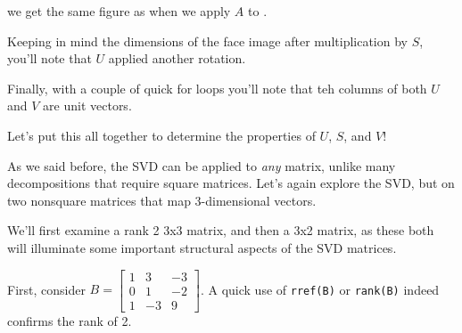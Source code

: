 \documentclass{ximera}
\begin{document}
\begin{problem}
  we get the same figure as when we apply $A$ to \facepoints. 

  Keeping in mind the dimensions of the face image after multiplication by $S$, you'll note that $U$ applied another rotation. 

  Finally, with a couple of quick for loops you'll note that teh columns of both $U$ and $V$ are unit vectors. 



Let's put this all together to determine the properties of $U$, $S$, and $V$!

\begin{selectAll}


\end{selectAll}

\end{problem}



As we said before, the SVD can be applied to \emph{any} matrix, unlike many decompositions that require square matrices. Let's again explore the SVD, but on two nonsquare matrices that map $3$-dimensional vectors.

We'll first examine a rank 2 3x3 matrix, and then a 3x2 matrix, as these both will illuminate some important structural aspects of the SVD matrices. 

First, consider $B=\begin{bmatrix}1&3&-3\\0&1&-2\\1&-3&9\end{bmatrix}$. A quick use of \texttt{rref(B)} or \texttt{rank(B)} indeed confirms the rank of 2. 
\end{document}
